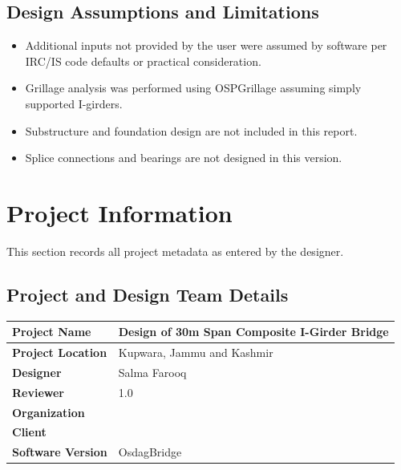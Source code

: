\documentclass[12pt,a4paper]{report}
\numberwithin{table}{chapter}
\numberwithin{figure}{chapter}
\begin{document}
\section*{Design Assumptions and Limitations}
\label{sec:assumptions}

\begin{itemize}
\item Additional inputs not provided by the user were assumed by software per IRC/IS code defaults or practical consideration.
\item Grillage analysis was performed using OSPGrillage assuming simply supported I-girders.
\item Substructure and foundation design are not included in this report.
\item Splice connections and bearings are not designed in this version.
\end{itemize}

\titleformat{\chapter}[block]{\normalfont\Large\bfseries\centering}{\thechapter}{1em}{}
\titlespacing*{\chapter}{0pt}{-30pt}{10pt}


\chapter{Project Information}

This section records all project metadata as entered by the designer.

\section{Project and Design Team Details}
\label{sec:project-details}

\begin{tabular}{|L{5.5cm}|L{8.5cm}|}
\hline
\textbf{Project Name} & Design of 30m Span Composite I-Girder Bridge \\
\hline
\textbf{Project Location} & Kupwara, Jammu and Kashmir \\
\hline
\textbf{Designer} & Salma Farooq \\
\hline
\textbf{Reviewer} & 1.0 \\
\hline
\textbf{Organization} &  \\
\hline
\textbf{Client} &  \\
\hline
\textbf{Software Version} & OsdagBridge \\
\hline
\end{tabular}
\end{document}
